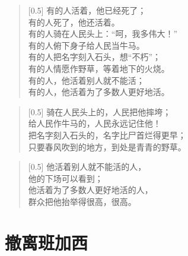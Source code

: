 \documentclass[12pt,UTF-8,openany]{ctexbook}
\begin{document}
\begin{large}
    
    \begin{verse}[0.5\linewidth]
        有的人活着，他已经死了； \\
        有的人死了，他还活着。 \\
        有的人骑在人民头上：“呵，我多伟大！” \\
        有的人俯下身子给人民当牛马。 \\
        有的人把名字刻入石头，想“不朽”； \\
        有的人情愿作野草，等着地下的火烧。 \\
        有的人，他活着别人就不能活； \\
        有的人，他活着为了多数人更好地活。
    \end{verse}
    
    
    \begin{verse}[0.5\linewidth]
        骑在人民头上的，人民把他摔垮； \\
        给人民作牛马的，人民永远记住他！ \\
        把名字刻入石头的，名字比尸首烂得更早； \\
        只要春风吹到的地方，到处是青青的野草。
    \end{verse}
    
    
    \begin{verse}[0.5\linewidth]
        他活着别人就不能活的人， \\
        他的下场可以看到； \\
        他活着为了多数人更好地活的人， \\
        群众把他抬举得很高，很高。
    \end{verse}
    
\end{large}



\chapter{撤离班加西}
\end{document}
